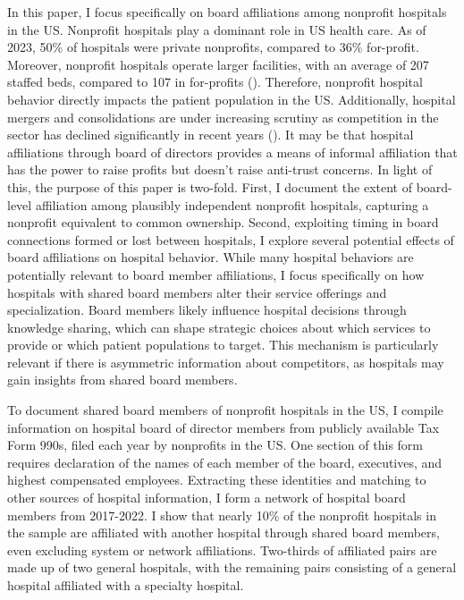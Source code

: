 \documentclass[12pt]{article}
\begin{document}
    In this paper, I focus specifically on board affiliations among nonprofit hospitals in the US. Nonprofit hospitals play a dominant role in US health care. As of 2023, 50\% of hospitals were private nonprofits, compared to 36\% for-profit. Moreover, nonprofit hospitals operate larger facilities, with an average of 207 staffed beds, compared to 107 in for-profits (\cite{ASPE_2023}). Therefore, nonprofit hospital behavior directly impacts the patient population in the US. Additionally, hospital mergers and consolidations are under increasing scrutiny as competition in the sector has declined significantly in recent years (\cite{levinson2024ten}). It may be that hospital affiliations through board of directors provides a means of informal affiliation that has the power to raise profits but doesn't raise anti-trust concerns. In light of this, the purpose of this paper is two-fold. First, I document the extent of board-level affiliation among plausibly independent nonprofit hospitals, capturing a nonprofit equivalent to common ownership. Second, exploiting timing in board connections formed or lost between hospitals, I explore several potential effects of board affiliations on hospital behavior. While many hospital behaviors are potentially relevant to board member affiliations, I focus specifically on how hospitals with shared board members alter their service offerings and specialization. Board members likely influence hospital decisions through knowledge sharing, which can shape strategic choices about which services to provide or which patient populations to target. This mechanism is particularly relevant if there is asymmetric information about competitors, as hospitals may gain insights from shared board members. 

    To document shared board members of nonprofit hospitals in the US, I compile information on hospital board of director members from publicly available Tax Form 990s, filed each year by nonprofits in the US. One section of this form requires declaration of the names of each member of the board, executives, and highest compensated employees. Extracting these identities and matching to other sources of hospital information, I form a network of hospital board members from 2017-2022. I show that nearly 10\% of the nonprofit hospitals in the sample are affiliated with another hospital through shared board members, even excluding system or network affiliations. Two-thirds of affiliated pairs are made up of two general hospitals, with the remaining pairs consisting of a general hospital affiliated with a specialty hospital. 
\end{document}

